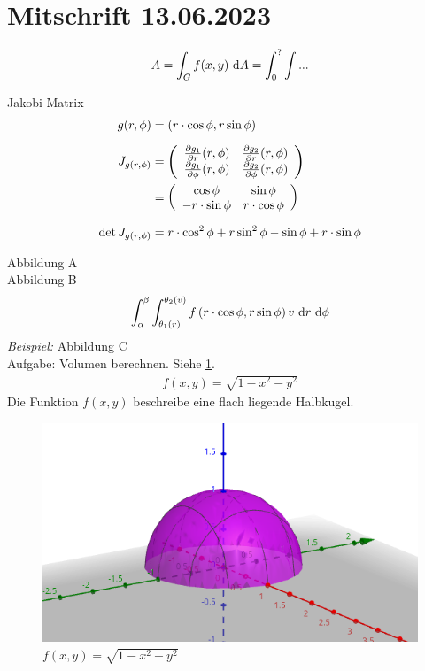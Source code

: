 \documentclass[main.tex]{subfiles}
\begin{document}
\section{Mitschrift 13.06.2023}
\begin{align*}
    A = \int_{G} f(x,y) \dx{A} = \int_0^? \int ... %
\end{align*}

Jakobi Matrix
\begin{align*}
    g(r, \phi) &= \left( r\cdot \cos \phi, r\sin\phi\right) \\[2mm]
    J_{g(r, \phi)} &= \eqmatrix{rr}{
        \frac{\partial g_1}{\partial r} (r,\phi) & \frac{\partial g_2}{\partial r} (r,\phi) \\
        \frac{\partial g_1}{\partial \phi} (r,\phi) & \frac{\partial g_2}{\partial \phi} (r,\phi) \\
    } \\
    &= \eqmatrix{cc}{
        \cos\phi & \sin\phi \\
        -r\cdot \sin\phi & r\cdot \cos\phi
    }\\[2mm]
    \det J_{g(r, \phi)} &= r\cdot \cos^2\phi + r\sin^2\phi - \sin\phi + r\cdot\sin\phi
\end{align*}

Abbildung A\\
Abbildung B\\
\begin{align*}
    \int_\alpha^\beta \int_{\theta_1(r)}^{\theta_2(v)} f\left( r\cdot \cos \phi, r\sin\phi \right) v \dx{r} \dx{\phi}
\end{align*}
\textit{Beispiel:}
Abbildung C\\
Aufgabe: Volumen berechnen. Siehe \ref{ab1}.
\begin{align*}
    f(x,y) = \sqrt{1- x^2 -y^2}
\end{align*}
Die Funktion $f(x,y)$ beschreibe eine flach liegende Halbkugel.
\begin{figure}
    \begin{center}
        \includegraphics*{ab1.png}
    \end{center}
    \caption{$f(x,y) = \sqrt{1- x^2 -y^2}$}
    \label{ab1}
\end{figure}
\end{document}

